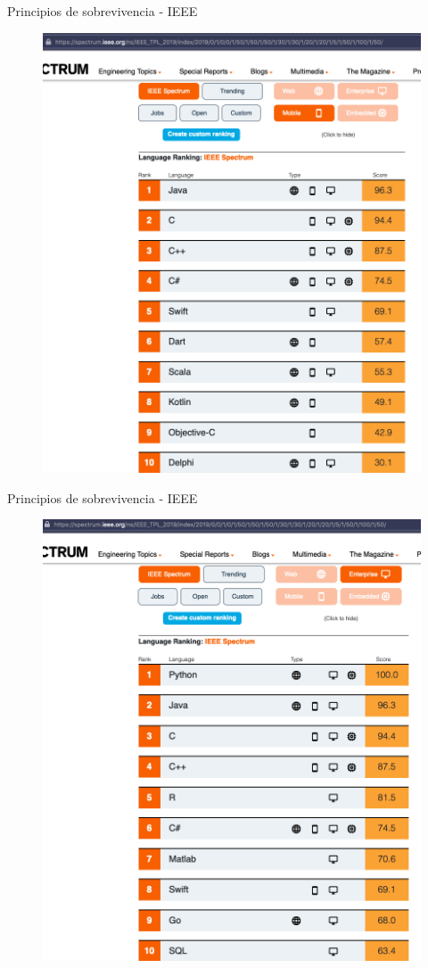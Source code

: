 \documentclass[aspectratio=169]{beamer}
\begin{document}
\begin{frame}{Principios de sobrevivencia - IEEE}
    \begin{figure}
        \centering
        \includegraphics[width=0.5\linewidth]{Images/ieeemobile}
    \end{figure}
\end{frame}

\begin{frame}{Principios de sobrevivencia - IEEE}
    \begin{figure}
        \centering
        \includegraphics[width=0.5\linewidth]{Images/ieeeenterpise}
    \end{figure}
\end{frame}
\end{document}
